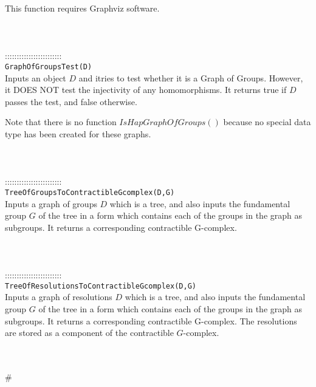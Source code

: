 \documentclass[a4paper,11pt]{report}
\begin{document}
{ This function requires Graphviz software. \\
 \\
 \\
 \\
 ::::::::::::::::::::::::\\
 \texttt{GraphOfGroupsTest(D) }\\
 

 Inputs an object $D$ and itries to test whether it is a Graph of Groups. However, it DOES NOT test
the injectivity of any homomorphisms. It returns true if $D$ passes the test, and false otherwise. 

 Note that there is no function $IsHapGraphOfGroups()$ because no special data type has been created for these graphs. \\
 \\
 \\
 \\
 ::::::::::::::::::::::::\\
 \texttt{TreeOfGroupsToContractibleGcomplex(D,G) }\\
 

 Inputs a graph of groups $D$ which is a tree, and also inputs the fundamental group $G$ of the tree in a form which contains each of the groups in the graph as
subgroups. It returns a corresponding contractible G-complex. \\
 \\
 \\
 \\
 ::::::::::::::::::::::::\\
 \texttt{TreeOfResolutionsToContractibleGcomplex(D,G) }\\
 

 Inputs a graph of resolutions $D$ which is a tree, and also inputs the fundamental group $G$ of the tree in a form which contains each of the groups in the graph as
subgroups. It returns a corresponding contractible G-complex. The resolutions
are stored as a component of the contractible $G$-complex. \\
 \\
 \\
 }

 \# 
\end{document}
